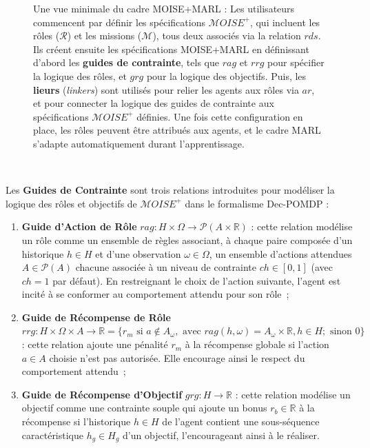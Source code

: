 \begin{figure}[h!]
    \centering
    
    \caption{Une vue minimale du cadre MOISE+MARL :
        Les utilisateurs commencent par définir les spécifications $\mathcal{M}OISE^+$, qui incluent les rôles ($\mathcal{R}$) et les missions ($\mathcal{M}$), tous deux associés via la relation $rds$.
        Ils créent ensuite les spécifications MOISE+MARL en définissant d'abord les \textbf{guides de contrainte}, tels que $rag$ et $rrg$ pour spécifier la logique des rôles, et $grg$ pour la logique des objectifs.
        Puis, les \textbf{lieurs} (\textit{linkers}) sont utilisés pour relier les agents aux rôles via $ar$, et pour connecter la logique des guides de contrainte aux spécifications $\mathcal{M}OISE^+$ définies.
        Une fois cette configuration en place, les rôles peuvent être attribués aux agents, et le cadre MARL s'adapte automatiquement durant l'apprentissage.}
    \label{fig:mm_synthesis}
\end{figure}

\

\noindent Les \textbf{Guides de Contrainte} sont trois relations introduites pour modéliser la logique des rôles et objectifs de $\mathcal{M}OISE^+$ dans le formalisme Dec-POMDP :

\begin{enumerate}[label={\roman*) },itemjoin={; \quad}]
    \item \textbf{Guide d'Action de Rôle} \quad $rag: H \times \Omega \rightarrow \mathcal{P}(A \times \mathbb{R})$ : cette relation modélise un rôle comme un ensemble de règles associant, à chaque paire composée d'un historique $h \in H$ et d'une observation $\omega \in \Omega$, un ensemble d'actions attendues $A \in \mathcal{P}(A)$ chacune associée à un niveau de contrainte $ch \in [0,1]$ (avec $ch = 1$ par défaut). En restreignant le choix de l'action suivante, l'agent est incité à se conformer au comportement attendu pour son rôle~;

    \item \textbf{Guide de Récompense de Rôle} \quad $rrg: H \times \Omega \times A \to \mathbb{R} = \{r_m \text{ si } a \notin A_\omega, \text{ avec } rag(h, \omega) = A_\omega \times \mathbb{R}, h \in H; \text{ sinon } 0\}$ : cette relation ajoute une pénalité $r_m$ à la récompense globale si l'action $a \in A$ choisie n'est pas autorisée. Elle encourage ainsi le respect du comportement attendu~;

    \item \textbf{Guide de Récompense d'Objectif} \quad $grg: H \rightarrow \mathbb{R}$ : cette relation modélise un objectif comme une contrainte souple qui ajoute un bonus $r_b \in \mathbb{R}$ à la récompense si l'historique $h \in H$ de l'agent contient une sous-séquence caractéristique $h_g \in H_g$ d'un objectif, l'encourageant ainsi à le réaliser.
\end{enumerate}

